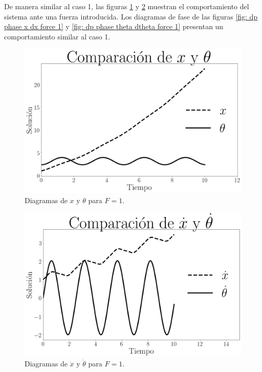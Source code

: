 \documentclass[12pt,letterpaper]{article}
\begin{document}
De manera similar al caso 1, las figuras \ref{fig: dp x theta force 1} y 
\ref{fig: dp dx dtheta force 1} muestran el comportamiento del sistema ante una fuerza introducida. Los diagramas de fase de las figuras \ref{fig: dp phase x dx force 1} y \ref{fig: dp phase theta dtheta force 1} presentan un comportamiento similar al caso 1. 

\begin{figure}[h]
 \centering
 \includegraphics[scale=0.4]{img/dp_x_theta_f1.png}
 \caption{Diagramas de $x$ y $\theta$ para $F=1$.}
 \label{fig: dp x theta force 1}
\end{figure}

\begin{figure}[h]
 \centering
 \includegraphics[scale=0.4]{img/dp_dx_dtheta_f1.png}
 \caption{Diagramas de $\dot{x}$ y $\dot{\theta}$ para $F=1$.}
 \label{fig: dp dx dtheta force 1}
\end{figure}
\end{document}

